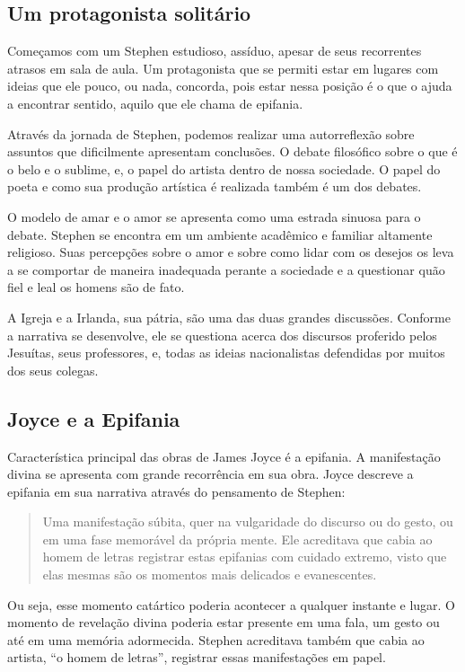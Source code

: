 \documentclass[12pt]{extarticle}
\begin{document}
{\subsection{Um protagonista solitário}

Começamos com um Stephen estudioso, assíduo, apesar de seus recorrentes
atrasos em sala de aula. Um protagonista que se permiti estar em lugares
com ideias que ele pouco, ou nada, concorda, pois estar nessa posição é
o que o ajuda a encontrar sentido, aquilo que ele chama de epifania.

Através da jornada de Stephen, podemos realizar uma autorreflexão sobre
assuntos que dificilmente apresentam conclusões. O debate filosófico
sobre o que é o belo e o sublime, e, o papel do artista dentro de nossa
sociedade. O papel do poeta e como sua produção artística é realizada
também é um dos debates.

O modelo de amar e o amor se apresenta como uma estrada sinuosa para o
debate. Stephen se encontra em um ambiente acadêmico e familiar
altamente religioso. Suas percepções sobre o amor e sobre como lidar com
os desejos os leva a se comportar de maneira inadequada perante a
sociedade e a questionar quão fiel e leal os homens são de fato.

A Igreja e a Irlanda, sua pátria, são uma das duas grandes discussões.
Conforme a narrativa se desenvolve, ele se questiona acerca dos
discursos proferido pelos Jesuítas, seus professores, e, todas as ideias
nacionalistas defendidas por muitos dos seus colegas.

\subsection{Joyce e a Epifania}

Característica principal das obras de James Joyce é a epifania. A
manifestação divina se apresenta com grande recorrência em sua obra.
Joyce descreve a epifania em sua narrativa através do pensamento de
Stephen:


\begin{quote}
Uma manifestação súbita, quer na vulgaridade do discurso ou do gesto,
ou em uma fase memorável da própria mente. Ele acreditava que cabia ao
homem de letras registrar estas epifanias com cuidado extremo, visto que
elas mesmas são os momentos mais delicados e evanescentes.
\end{quote}

Ou seja, esse momento catártico poderia acontecer a qualquer instante e
lugar. O momento de revelação divina poderia estar presente em uma fala,
um gesto ou até em uma memória adormecida. Stephen acreditava também que
cabia ao artista, ``o homem de letras'', registrar essas manifestações
em papel.

}
\end{document}
